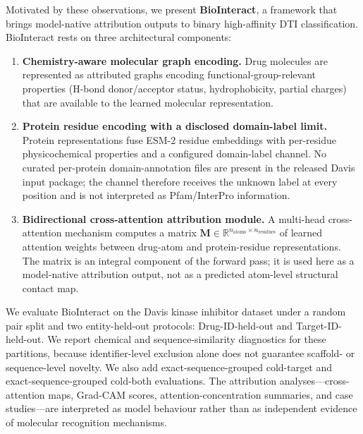 \documentclass[fleqn,10pt]{wlscirep}
\begin{document}
Motivated by these observations, we present \textbf{BioInteract}, a framework
\begingroup\color{red}that brings model-native attribution outputs to binary
high-affinity DTI classification.  BioInteract rests on three architectural
components:\endgroup

\begin{enumerate}[leftmargin=*]
\item \textbf{Chemistry-aware molecular graph encoding.}  Drug molecules are
  represented as attributed graphs encoding functional-group-relevant properties
  (H-bond donor/acceptor status, hydrophobicity, partial charges) that
  \begingroup\color{red}are available to the learned molecular
  representation.\endgroup

\begingroup\color{red}
\item \textbf{Protein residue encoding with a disclosed domain-label limit.}
  Protein representations fuse ESM-2 residue embeddings with per-residue
  physicochemical properties and a configured domain-label channel. No curated
  per-protein domain-annotation files are present in the released Davis input
  package; the channel therefore receives the unknown label at every position
  and is not interpreted as Pfam/InterPro information.
\endgroup

\item \textbf{Bidirectional cross-attention attribution module.}  A multi-head
  cross-attention mechanism computes a matrix
  $\mathbf{M} \in \mathbb{R}^{n_\text{atoms} \times n_\text{residues}}$ of
  learned attention weights between drug-atom and protein-residue
  representations.  The matrix is an integral component of the forward pass;
  it is used here as a model-native attribution output, not as a predicted
  atom-level structural contact map.
\end{enumerate}

We evaluate BioInteract on the Davis kinase inhibitor
dataset\cite{davis2011comprehensive} under a random pair split and two
entity-held-out protocols: \begingroup\color{red}Drug-ID-held-out and
Target-ID-held-out\endgroup. We report chemical and sequence-similarity
diagnostics for these partitions, because identifier-level exclusion alone does
not guarantee scaffold- or sequence-level novelty.  We also add
exact-sequence-grouped cold-target and \begingroup\color{red}exact-sequence-grouped\endgroup{}
cold-both evaluations.  The attribution
analyses---cross-attention maps, Grad-CAM scores, attention-concentration
summaries, and case studies---are interpreted as model behaviour rather than as
independent evidence of molecular recognition mechanisms.
\end{document}
